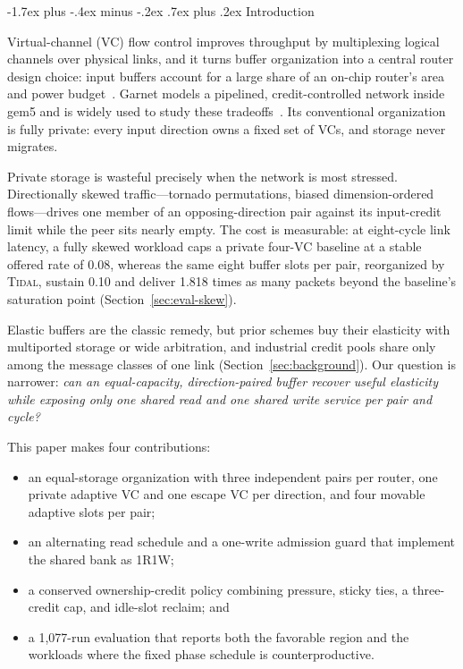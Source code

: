 \documentclass[10pt,twocolumn]{article}
\makeatletter
\newcommand{\system}{\textsc{Tidal}\xspace}
\renewcommand\section{\@startsection{section}{1}{\z@}%
  {-1.7ex plus -.4ex minus -.2ex}%
  {.7ex plus .2ex}%
  {\normalfont\large\bfseries}}
\makeatother
\begin{document}
\section{Introduction}

Virtual-channel (VC) flow control improves throughput by multiplexing logical
channels over physical links, and it turns buffer organization into a central
router design choice: input buffers account for a large share of an on-chip
router's area and power budget~\cite{dally1992virtual,nicopoulos2006vichar}.
Garnet models a pipelined, credit-controlled network inside gem5 and is widely
used to study these tradeoffs~\cite{agarwal2009garnet,binkert2011gem5}. Its
conventional organization is fully private: every input direction owns a
fixed set of VCs, and storage never migrates.

Private storage is wasteful precisely when the network is most stressed.
Directionally skewed traffic---tornado permutations, biased
dimension-ordered flows---drives one member of an opposing-direction pair
against its input-credit limit while the peer sits nearly empty. The cost is
measurable: at eight-cycle link latency, a fully skewed workload caps a
private four-VC baseline at a stable offered rate of 0.08, whereas the same
eight buffer slots per pair, reorganized by \system, sustain 0.10 and deliver
1.818 times as many packets beyond the baseline's saturation point
(Section~\ref{sec:eval-skew}).

Elastic buffers are the classic remedy, but prior schemes buy their
elasticity with multiported storage or wide arbitration, and industrial
credit pools share only among the message classes of one link
(Section~\ref{sec:background}). Our question is narrower: \emph{can an
equal-capacity, direction-paired buffer recover useful elasticity while
exposing only one shared read and one shared write service per pair and
cycle?}

This paper makes four contributions:
\begin{itemize}
  \setlength{\itemsep}{0pt}
  \setlength{\topsep}{2pt}
  \item an equal-storage organization with three independent pairs per router,
  one private adaptive VC and one escape VC per direction, and four movable
  adaptive slots per pair;
  \item an alternating read schedule and a one-write admission guard that
  implement the shared bank as 1R1W;
  \item a conserved ownership-credit policy combining pressure, sticky ties,
  a three-credit cap, and idle-slot reclaim; and
  \item a 1,077-run evaluation that reports both the favorable region and
  the workloads where the fixed phase schedule is counterproductive.
\end{itemize}
\end{document}
